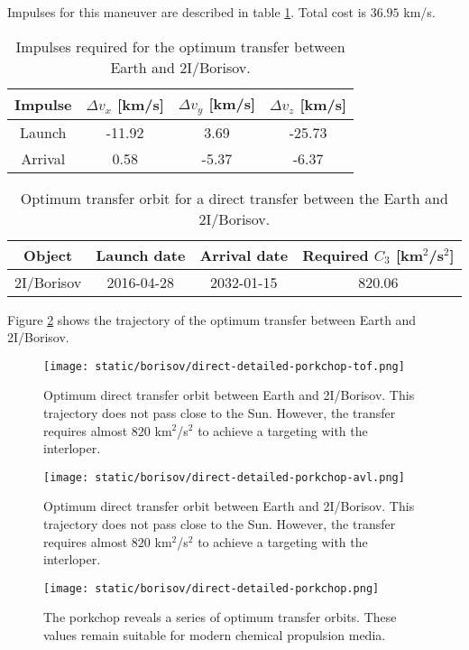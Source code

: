 Impulses for this maneuver are described in table
\ref{tab:borisov-direct-transfer-impulses}. Total cost is $36.95$ km/s.

\begin{table}[H]
  \centering
  \begin{tabular}{|c|c|c|c|}
    \hline
    Impulse & $\Delta v_x$ [km/s] & $\Delta v_y$ [km/s] & $\Delta v_z$ [km/s] \\
    \hline
    Launch & -11.92 & 3.69 & -25.73 \\
    \hline
    Arrival & 0.58 & -5.37 & -6.37 \\
    \hline
  \end{tabular}
  \caption{Impulses required for the optimum transfer between Earth and 2I/Borisov.}
  \label{tab:borisov-direct-transfer-impulses}
\end{table}


\vspace{1cm}
\begin{table}[H]
  \centering
  \begin{tabular}{|c|c|c|c|}
    \hline
    Object & Launch date & Arrival date & Required $C_3$ [km$^2$/s$^2$] \\
    \hline
    2I/Borisov & 2016-04-28 & 2032-01-15 & 820.06 \\
    \hline
  \end{tabular}
  \caption{Optimum transfer orbit for a direct transfer between the Earth and 2I/Borisov.}
  \label{tab:borisov-direct-transfer-optimum}
\end{table}

Figure \ref{fig:borisov-direct-transfer-orbit} shows the trajectory of the
optimum transfer between Earth and 2I/Borisov.

\begin{figure}[H]
  \centering
  \texttt{[image: static/borisov/direct-detailed-porkchop-tof.png]}
  \caption{Optimum direct transfer orbit between Earth and 2I/Borisov. This
        trajectory does not pass close to the Sun. However, the transfer requires almost $820$
        km$^2$/s$^2$ to achieve a targeting with the interloper.}
  \label{fig:borisov-direct-transfer-orbit}
\end{figure}

\begin{figure}[H]
  \centering
  \texttt{[image: static/borisov/direct-detailed-porkchop-avl.png]}
  \caption{Optimum direct transfer orbit between Earth and 2I/Borisov. This
        trajectory does not pass close to the Sun. However, the transfer requires almost $820$
        km$^2$/s$^2$ to achieve a targeting with the interloper.}
  \label{fig:borisov-direct-transfer-orbit}
\end{figure}

\begin{figure}[H]
  \centering
  \texttt{[image: static/borisov/direct-detailed-porkchop.png]}
        \caption[Detailed porkchop showing the optimum transfer for
        2I/Borisov]{The porkchop reveals a series of optimum transfer orbits.
        These values remain suitable for modern chemical propulsion media.}
  \label{fig:borisov-direct-detailed-porkchop}
\end{figure}
